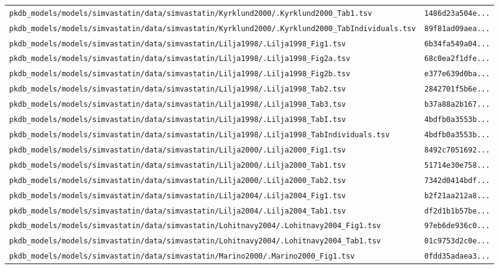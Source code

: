 \documentclass{article}
\begin{document}
\begin{longtable}{ll}
\texttt{pkdb\_models/models/simvastatin/data/simvastatin/Kyrklund2000/.Kyrklund2000\_Tab1.tsv} & \texttt{1486d23a504e...} \\
\texttt{pkdb\_models/models/simvastatin/data/simvastatin/Kyrklund2000/.Kyrklund2000\_TabIndividuals.tsv} & \texttt{89f81ad09aea...} \\
\texttt{pkdb\_models/models/simvastatin/data/simvastatin/Lilja1998/.Lilja1998\_Fig1.tsv} & \texttt{6b34fa549a04...} \\
\texttt{pkdb\_models/models/simvastatin/data/simvastatin/Lilja1998/.Lilja1998\_Fig2a.tsv} & \texttt{68c0ea2f1dfe...} \\
\texttt{pkdb\_models/models/simvastatin/data/simvastatin/Lilja1998/.Lilja1998\_Fig2b.tsv} & \texttt{e377e639d0ba...} \\
\texttt{pkdb\_models/models/simvastatin/data/simvastatin/Lilja1998/.Lilja1998\_Tab2.tsv} & \texttt{2842701f5b6e...} \\
\texttt{pkdb\_models/models/simvastatin/data/simvastatin/Lilja1998/.Lilja1998\_Tab3.tsv} & \texttt{b37a88a2b167...} \\
\texttt{pkdb\_models/models/simvastatin/data/simvastatin/Lilja1998/.Lilja1998\_TabI.tsv} & \texttt{4bdfb0a3553b...} \\
\texttt{pkdb\_models/models/simvastatin/data/simvastatin/Lilja1998/.Lilja1998\_TabIndividuals.tsv} & \texttt{4bdfb0a3553b...} \\
\texttt{pkdb\_models/models/simvastatin/data/simvastatin/Lilja2000/.Lilja2000\_Fig1.tsv} & \texttt{8492c7051692...} \\
\texttt{pkdb\_models/models/simvastatin/data/simvastatin/Lilja2000/.Lilja2000\_Tab1.tsv} & \texttt{51714e30e758...} \\
\texttt{pkdb\_models/models/simvastatin/data/simvastatin/Lilja2000/.Lilja2000\_Tab2.tsv} & \texttt{7342d0414bdf...} \\
\texttt{pkdb\_models/models/simvastatin/data/simvastatin/Lilja2004/.Lilja2004\_Fig1.tsv} & \texttt{b2f21aa212a8...} \\
\texttt{pkdb\_models/models/simvastatin/data/simvastatin/Lilja2004/.Lilja2004\_Tab1.tsv} & \texttt{df2d1b1b57be...} \\
\texttt{pkdb\_models/models/simvastatin/data/simvastatin/Lohitnavy2004/.Lohitnavy2004\_Fig1.tsv} & \texttt{97eb6de936c0...} \\
\texttt{pkdb\_models/models/simvastatin/data/simvastatin/Lohitnavy2004/.Lohitnavy2004\_Tab1.tsv} & \texttt{01c9753d2c0e...} \\
\texttt{pkdb\_models/models/simvastatin/data/simvastatin/Marino2000/.Marino2000\_Fig1.tsv} & \texttt{0fdd35adaea3...} \\

\end{longtable}
\end{document}

